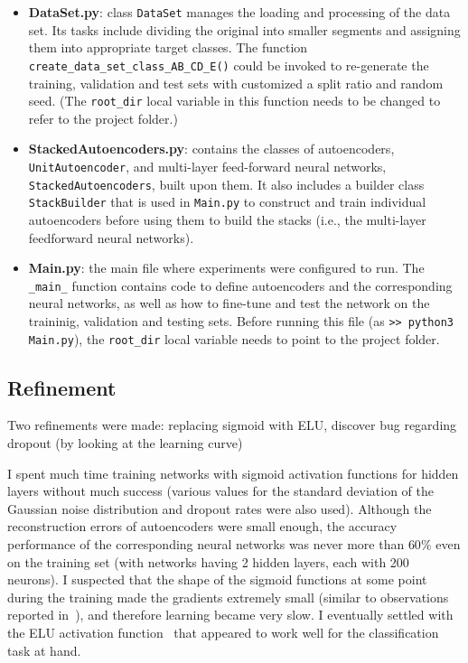 \documentclass[12pt]{article}
\begin{document}
\begin{itemize}
\item \textbf{DataSet.py}: class \texttt{DataSet} manages the loading and processing of the data set. Its tasks include dividing the original into smaller segments and assigning them into appropriate target classes. The function \texttt{create\_data\_set\_class\_AB\_CD\_E()} could be invoked to re-generate the training, validation and test sets with customized a split ratio and random seed. (The \texttt{root\_dir} local variable in this function needs to be changed to refer to the project folder.)
\item \textbf{StackedAutoencoders.py}: contains the classes of autoencoders, \texttt{UnitAutoencoder}, and multi-layer feed-forward neural networks, \texttt{StackedAutoencoders}, built upon them. It also includes a builder class \texttt{StackBuilder} that is used in \texttt{Main.py} to construct and train individual autoencoders before using them to build the stacks (i.e., the multi-layer feedforward neural networks).
\item \textbf{Main.py}: the main file where experiments were configured to run. The \texttt{\_main\_} function contains code to define autoencoders and the corresponding neural networks, as well as how to fine-tune and test the network on the traininig, validation and testing sets. Before running this file (as \texttt{>> python3 Main.py}), the \texttt{root\_dir} local variable needs to point to the project folder.
\end{itemize}

\subsection{Refinement}

Two refinements were made: replacing sigmoid with ELU, discover bug regarding dropout (by looking at the learning curve)

\noindent
I spent much time training networks with sigmoid activation functions for hidden layers without much success (various values for the standard deviation of the Gaussian noise distribution and dropout rates were also used). Although the reconstruction errors of autoencoders were small enough, the accuracy performance of the corresponding neural networks was never more than $60\%$ even on the training set (with networks having 2 hidden layers, each with 200 neurons). I suspected that the shape of the sigmoid functions at some point during the training made the gradients extremely small (similar to observations reported in~\cite{glorot2010understanding}), and therefore learning became very slow. I eventually settled with the ELU activation function~\cite{clevert2015fast} that appeared to work well for the classification task at hand.
\end{document}

